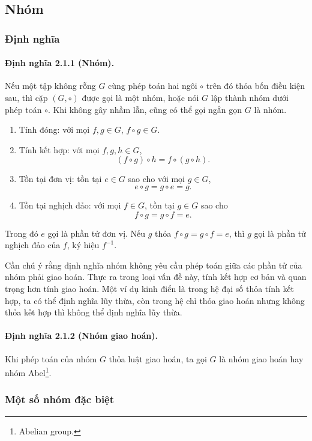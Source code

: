 \documentclass[11pt]{article}
\begin{document}
\subsection{Nhóm}

\subsubsection{Định nghĩa}

\paragraph{Định nghĩa 2.1.1 (Nhóm).}
Nếu một tập không rỗng \(G\) cùng phép toán hai ngôi \(\circ\) trên đó thỏa bốn
điều kiện sau, thì cặp \((G,\circ)\) được gọi là một nhóm, hoặc nói \(G\) lập
thành nhóm dưới phép toán \(\circ\). Khi không gây nhầm lẫn, cũng có thể gọi
ngắn gọn \(G\) là nhóm.

\begin{enumerate}
  \item Tính đóng: với mọi \(f,g\in G\), \(f\circ g\in G\).
  \item Tính kết hợp: với mọi \(f,g,h\in G\),
  \[
    (f\circ g)\circ h=f\circ(g\circ h).
  \]
  \item Tồn tại đơn vị: tồn tại \(e\in G\) sao cho với mọi \(g\in G\),
  \[
    e\circ g=g\circ e=g.
  \]
  \item Tồn tại nghịch đảo: với mọi \(f\in G\), tồn tại \(g\in G\) sao cho
  \[
    f\circ g=g\circ f=e.
  \]
\end{enumerate}

Trong đó \(e\) gọi là phần tử đơn vị. Nếu \(g\) thỏa
\(f\circ g=g\circ f=e\), thì \(g\) gọi là phần tử nghịch đảo của \(f\), ký hiệu
\(f^{-1}\).

Cần chú ý rằng định nghĩa nhóm không yêu cầu phép toán giữa các phần tử của
nhóm phải giao hoán. Thực ra trong loại vấn đề này, tính kết hợp cơ bản và quan
trọng hơn tính giao hoán. Một ví dụ kinh điển là trong hệ đại số thỏa tính kết
hợp, ta có thể định nghĩa lũy thừa, còn trong hệ chỉ thỏa giao hoán nhưng không
thỏa kết hợp thì không thể định nghĩa lũy thừa.

\paragraph{Định nghĩa 2.1.2 (Nhóm giao hoán).}
Khi phép toán của nhóm \(G\) thỏa luật giao hoán, ta gọi \(G\) là nhóm giao
hoán hay nhóm Abel\footnote{Abelian group.}.

\subsubsection{Một số nhóm đặc biệt}
\end{document}
